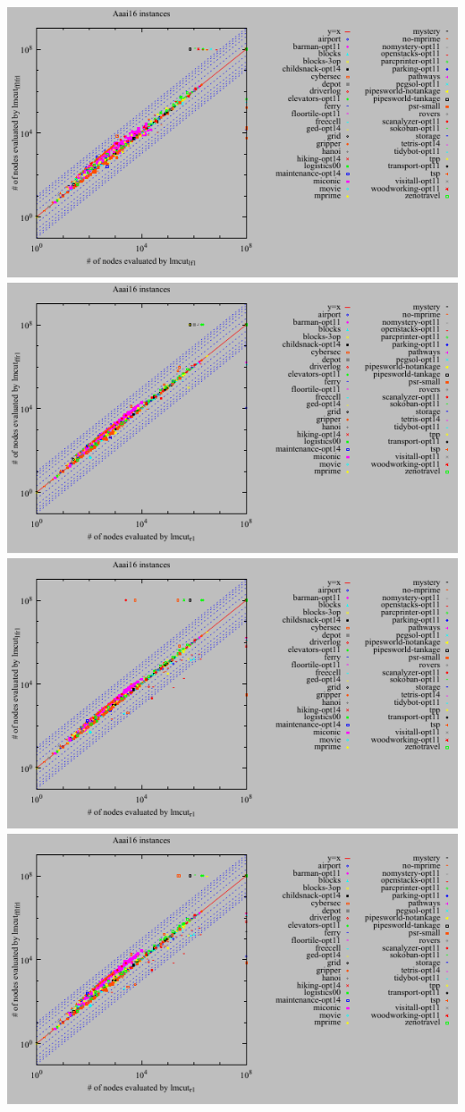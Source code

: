 \includegraphics{tables/aaai16-evaluated-lmcut_lf-lmcut_fflfr.pdf}
\linebreak
\includegraphics{tables/aaai16-evaluated-lmcut_r-lmcut_ffr.pdf}
\linebreak
\includegraphics{tables/aaai16-evaluated-lmcut_r-lmcut_lfr.pdf}
\linebreak
\includegraphics{tables/aaai16-evaluated-lmcut_r-lmcut_fflfr.pdf}
\linebreak
